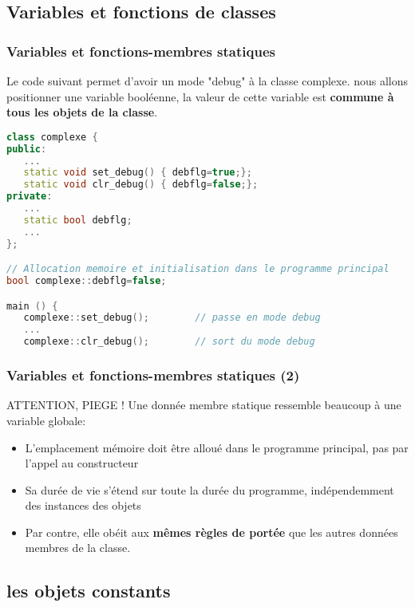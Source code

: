 \documentclass{beamer}
\begin{document}
\subsection{Variables et fonctions de classes}
\begin{frame}[fragile=singleslide,shrink=20]
\frametitle {Variables et fonctions-membres statiques}
Le code suivant permet d'avoir un mode "debug" à la classe complexe. nous allons positionner une variable booléenne, 
la valeur de cette variable est \textbf{commune à tous les objets de la classe}.
\begin{lstlisting}[language=c++]
class complexe {
public:
   ...
   static void set_debug() { debflg=true;};
   static void clr_debug() { debflg=false;};
private:
   ...
   static bool debflg;
   ...
};

// Allocation memoire et initialisation dans le programme principal
bool complexe::debflg=false;

main () {
   complexe::set_debug();        // passe en mode debug
   ...
   complexe::clr_debug();        // sort du mode debug
\end{lstlisting}
\end{frame}

\begin{frame}[fragile=singleslide,shrink=20]
\frametitle {Variables et fonctions-membres statiques (2)}
\begin{block}{ATTENTION, PIEGE !}
Une donnée membre statique ressemble beaucoup à une variable globale:
\begin{itemize}
\item{L'emplacement mémoire doit être alloué dans le programme principal, pas par l'appel au constructeur}
\item{Sa durée de vie s'étend sur toute la durée du programme, indépendemment des instances des objets}
\item{Par contre, elle obéit aux \textbf{mêmes règles de portée} que les autres données membres de la classe.}
\end{itemize}
\end{block}
\end{frame}

\subsection{les objets constants}
\end{document}
